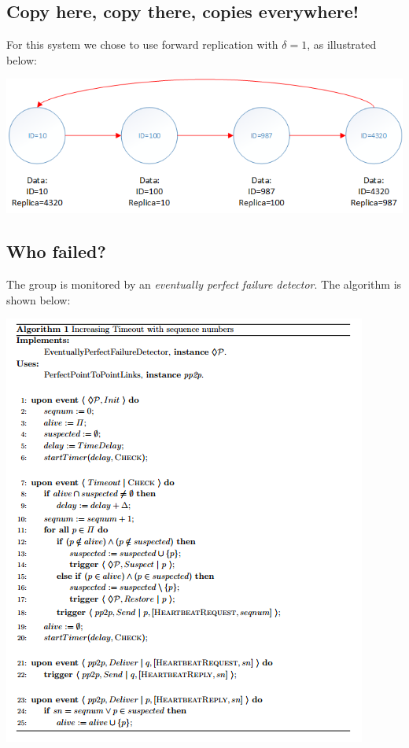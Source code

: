 \documentclass[a4paper, 11pt]{article}
\begin{document}
\subsection{Copy here, copy there, copies everywhere!}

\noindent For this system we chose to use forward replication with $\delta = 1$, as illustrated below: 

{\centering\includegraphics[scale = 0.8]{./figures/replication.png}\par}

\subsection{Who failed?}

\noindent The group is monitored by an \textit{eventually perfect failure detector}. The algorithm is shown below:

{\centering\includegraphics[scale = 0.95]{./figures/epfd-algorithm.png}\par}
\end{document}
